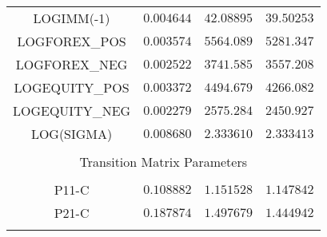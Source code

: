 \begin{tabular}{lrrr}
\multicolumn{1}{c}{LOGIMM(-1)}&\multicolumn{1}{c}{$0.004644$}&\multicolumn{1}{c}{$42.08895$}&\multicolumn{1}{c}{$39.50253$}\\
\multicolumn{1}{c}{LOGFOREX\_POS}&\multicolumn{1}{c}{$0.003574$}&\multicolumn{1}{c}{$5564.089$}&\multicolumn{1}{c}{$5281.347$}\\
\multicolumn{1}{c}{LOGFOREX\_NEG}&\multicolumn{1}{c}{$0.002522$}&\multicolumn{1}{c}{$3741.585$}&\multicolumn{1}{c}{$3557.208$}\\
\multicolumn{1}{c}{LOGEQUITY\_POS}&\multicolumn{1}{c}{$0.003372$}&\multicolumn{1}{c}{$4494.679$}&\multicolumn{1}{c}{$4266.082$}\\
\multicolumn{1}{c}{LOGEQUITY\_NEG}&\multicolumn{1}{c}{$0.002279$}&\multicolumn{1}{c}{$2575.284$}&\multicolumn{1}{c}{$2450.927$}\\
\multicolumn{1}{c}{LOG(SIGMA)}&\multicolumn{1}{c}{$0.008680$}&\multicolumn{1}{c}{$2.333610$}&\multicolumn{1}{c}{$2.333413$}\\
[4.5pt] \hline \\ [-4.5pt]
\multicolumn{4}{c}{Transition Matrix Parameters}\\
[4.5pt] \hline \\ [-4.5pt]
\multicolumn{1}{c}{P11-C}&\multicolumn{1}{c}{$0.108882$}&\multicolumn{1}{c}{$1.151528$}&\multicolumn{1}{c}{$1.147842$}\\
\multicolumn{1}{c}{P21-C}&\multicolumn{1}{c}{$0.187874$}&\multicolumn{1}{c}{$1.497679$}&\multicolumn{1}{c}{$1.444942$}\\
[4.5pt] \hline \\ [-4.5pt]
\end{tabular}
